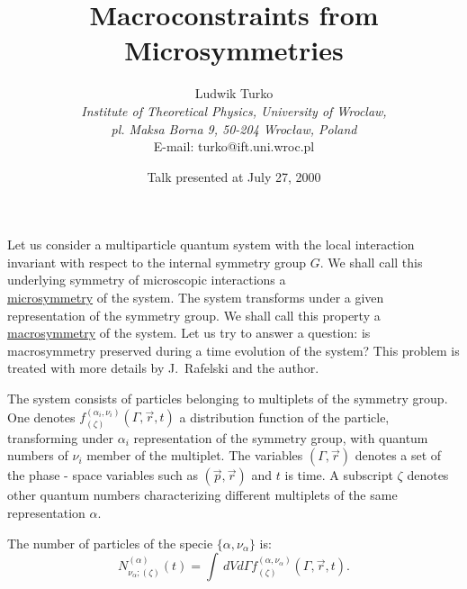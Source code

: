 \documentclass[a4paper]{article}
\begin{document}
\title{Macroconstraints from Microsymmetries}%
\author{Ludwik
Turko\\ {\em Institute of Theoretical Physics, University of
Wroclaw,}\\ {\em pl. Maksa Borna 9, 50-204 Wroc\l aw, Poland}\\
{\small E-mail: turko@ift.uni.wroc.pl}}
\date{Talk presented at July 27, 2000}

Let us consider a multiparticle quantum system with the local
interaction invariant with respect to the internal symmetry group
$G$. We shall call this underlying symmetry of microscopic
interactions a\\ \underline{microsymmetry} of the system. The
system transforms under a given representation of the symmetry
group. We shall call this property a \underline{macrosymmetry} of
the system. Let us try to answer a question: is macrosymmetry
preserved during a time evolution of the system? This problem is
treated with more details by J.~Rafelski and the
author\cite{TurRaf}.

The system consists of particles belonging to multiplets of the
symmetry group. One denotes
$f^{(\alpha_i,\nu_i)}_{(\zeta)}(\Gamma,\vec r,t)$ a distribution
function of the particle, transforming under $\alpha_i$
representation of the symmetry group, with quantum numbers of
$\nu_i$ member of the multiplet. The variables $(\Gamma,\vec r)$
denotes a  set of the phase - space variables such as $(\vec
p,\vec r)$ and $t$ is time. A subscript $\zeta$ denotes other
quantum numbers characterizing different multiplets of the same
representation $\alpha$.

The number of particles of the specie $\{\alpha,\nu_\alpha\}$ is:
\begin{equation}
N^{(\alpha)}_{\nu_\alpha;(\zeta)}(t)=\int\,dV d\Gamma
f^{(\alpha,\nu_\alpha)}_{(\zeta)}(\Gamma,\vec r,t).
\label{numb}
\end{equation}
\end{document}
